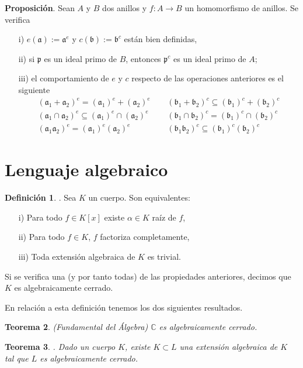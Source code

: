 \documentclass[a4paper,12pt]{article}
\newcommand{\C}{\mathbb{C}}
\newcommand{\p}{\mathfrak{p}}
\newcommand{\af}{\mathfrak{a}}
\newcommand{\bfr}{\mathfrak{b}}
\newtheorem{theorem}{Teorema}
\theoremstyle{definition}
\newtheorem{definition}[theorem]{Definición}
\begin{document}
\textbf{Proposición}. Sean $A$ y $B$ dos anillos y $f:A\longrightarrow B$ un homomorfismo de anillos. Se verifica
\begin{itemize}
    \item[i)] $e(\af):=\af^e$ y $c(\bfr):=\bfr^c$ están bien definidas,
    \item[ii)] si $\p$ es un ideal primo de $B$, entonces $\p^c$ es un ideal primo de $A$;
    \item[iii)]el comportamiento de $e$ y $c$ respecto de las operaciones anteriores es el siguiente\begin{align*}
        (\af_1+\af_2)^e=(\af_1)^e+(\af_2)^e\hspace{15pt}& (\bfr_1+\bfr_2)^c\subseteq(\bfr_1)^c+(\bfr_2)^c\\
        (\af_1\cap\af_2)^e\subseteq(\af_1)^e\cap(\af_2)^e\hspace{15pt}&(\bfr_1\cap\bfr_2)^c=(\bfr_1)^c\cap(\bfr_2)^c\\
        (\af_1\af_2)^e=(\af_1)^e(\af_2)^e\hspace{15pt}& (\bfr_1\bfr_2)^c\subseteq(\bfr_1)^c(\bfr_2)^c
    \end{align*}
\end{itemize}

\section{Lenguaje algebraico}
\begin{definition}. Sea $K$ un cuerpo. Son equivalentes:\begin{itemize}
    \item[i)] Para todo $f\in K[x]$ existe $\alpha\in K$ raíz de $f$,
    \item[ii)] Para todo $f\in K$, $f$ factoriza completamente,
    \item[iii)] Toda extensión algebraica de $ K$ es trivial.
\end{itemize}
Si se verifica una (y por tanto todas) de las propiedades anteriores, decimos que $ K$ es algebraicamente cerrado.
\end{definition}

En relación a esta definición tenemos los dos siguientes resultados.

\begin{theorem} (Fundamental del Álgebra) $\C$ es algebraicamente cerrado.
\end{theorem}

\begin{theorem}. Dado un cuerpo $K$, existe $K\subset L$ una extensión algebraica de $K$ tal que $L$ es algebraicamente cerrado.
\end{theorem}
\end{document}

